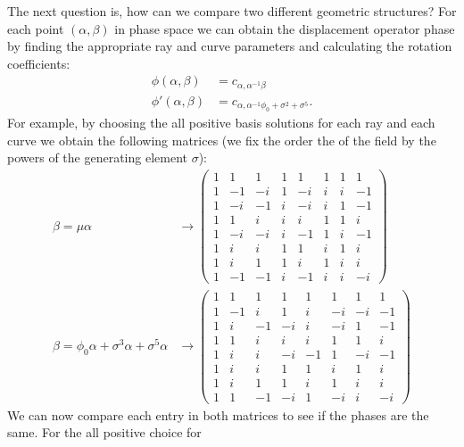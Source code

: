 \documentclass[a4paper]{article}
\begin{document}
  The next question is, how can we compare two different
  geometric structures? For each point $(\alpha,\beta)$ in
  phase space we can obtain the displacement operator phase
  by finding the appropriate ray and curve parameters and
  calculating the rotation coefficients:
  \begin{align}
    \phi(\alpha,\beta)
    &= c_{\alpha,\alpha^{-1}\beta} \\
    \phi'(\alpha,\beta)
    &= c_{\alpha,\alpha^{-1}\phi_0 + \sigma^2 + \sigma^{5}}.
  \end{align}
  For example, by choosing the all positive basis solutions
  for each ray and each curve we obtain the following
  matrices (we fix the order the of the field by the powers
  of the generating element $\sigma$):
  \begin{align}
    \beta = \mu \alpha
    &\rightarrow
    \displaystyle \left(\begin{array}{rrrrrrrr}
    1 & 1 & 1 & 1 & 1 & 1 & 1 & 1 \\
    1 & -1 & -i & 1 & -i & i & i & -1 \\
    1 & -i & -1 & i & -i & i & 1 & -1 \\
    1 & 1 & i & i & i & 1 & 1 & i \\
    1 & -i & -i & i & -1 & 1 & i & -1 \\
    1 & i & i & 1 & 1 & i & 1 & i \\
    1 & i & 1 & 1 & i & 1 & i & i \\
    1 & -1 & -1 & i & -1 & i & i & -i
    \end{array}\right) \\
    \beta = \phi_0 \alpha + \sigma^3 \alpha + \sigma^5 \alpha
    &\rightarrow
    \displaystyle \left(\begin{array}{rrrrrrrr}
    1 & 1 & 1 & 1 & 1 & 1 & 1 & 1 \\
    1 & -1 & i & 1 & i & -i & -i & -1 \\
    1 & i & -1 & -i & i & -i & 1 & -1 \\
    1 & 1 & i & i & i & 1 & 1 & i \\
    1 & i & i & -i & -1 & 1 & -i & -1 \\
    1 & i & i & 1 & 1 & i & 1 & i \\
    1 & i & 1 & 1 & i & 1 & i & i \\
    1 & 1 & -1 & -i & 1 & -i & i & -i
    \end{array}\right)
  \end{align}
  We can now compare each entry in both matrices to see if
  the phases are the same. For the all positive choice for
\end{document}
